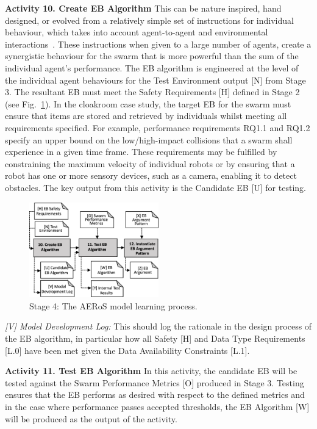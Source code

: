 \documentclass{article}
\begin{document}
\noindent\textbf{Activity 10. Create EB Algorithm} 
This can be nature inspired, hand designed, or evolved from a relatively simple set of instructions for individual behaviour, which takes into account agent-to-agent and environmental interactions~\cite{Jones2018}. These instructions when given to a large number of agents, create a synergistic behaviour for the swarm that is more powerful than the sum of the individual agent's performance. 
The EB algorithm is engineered at the level of the individual agent behaviours for the Test Environment output [N] from Stage 3. The resultant EB must meet the Safety Requirements [H] defined in Stage 2 (see Fig.~\ref{aeros-stage4}). 
In the cloakroom case study, the target EB for the swarm must ensure that items are stored and retrieved by individuals whilst meeting all requirements specified. For example, performance requirements RQ1.1 and RQ1.2 specify an upper bound on the low/high-impact collisions that a swarm shall experience in a given time frame. 
These requirements may be fulfilled by constraining the maximum velocity of individual robots or by ensuring that a robot has one or more sensory devices, such as a camera, enabling it to detect obstacles. 
The key output from this activity is the Candidate EB [U] for testing.
\begin{figure}[!h]
	\centering
	\includegraphics[width=0.5\textwidth]{AERoS-Stage4.pdf}
	\caption{Stage 4: The AERoS model learning process.}
	\label{aeros-stage4}
\end{figure}

\emph{[V] Model Development Log:} This should log the rationale in the design process of the EB algorithm, in particular how all Safety [H] and Data Type Requirements [L.0] have been met given the Data Availability Constraints [L.1].

\noindent\textbf{Activity 11. Test EB Algorithm} In this activity, the candidate EB will be tested against the Swarm Performance Metrics [O] produced in Stage 3. Testing ensures that the EB performs as desired with respect to the defined metrics and in the case where performance passes accepted thresholds, the EB Algorithm [W] will be produced as the output of the activity. 
\end{document}
